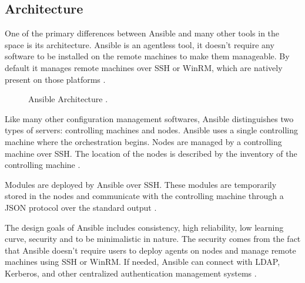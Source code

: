\documentclass[9pt,twocolumn,twoside]{../../styles/osajnl}
\begin{document}
\subsection{Architecture}

One of the primary differences between Ansible and many other tools in
the space is its architecture. Ansible is an agentless tool, it
doesn't require any software to be installed on the remote machines
to make them manageable. By default it manages remote machines over
SSH or WinRM, which are natively present on those
platforms \cite{www-ansible}.

\begin{figure}[htbp]
\centering
{}
\caption{Ansible Architecture \cite{www-ansible-arch-pic}.}
\label{fig:false-color}
\end{figure}

Like many other configuration management softwares, Ansible
distinguishes two types of servers: controlling machines and
nodes. Ansible uses a single controlling machine where the
orchestration begins. Nodes are managed by a controlling machine over
SSH. The location of the nodes is described by the inventory of the
controlling machine \cite{www-ansible3}.

Modules are deployed by Ansible over SSH. These modules are
temporarily stored in the nodes and communicate with the controlling
machine through a JSON protocol over the standard
output \cite{www-ansible}.

The design goals of Ansible includes consistency, high reliability,
low learning curve, security and to be minimalistic in nature. The
security comes from the fact that Ansible doesn't require users to
deploy agents on nodes and manage remote machines using SSH or
WinRM. If needed, Ansible can connect with LDAP, Kerberos, and other
centralized authentication management systems \cite{www-ansible2}.
\end{document}
